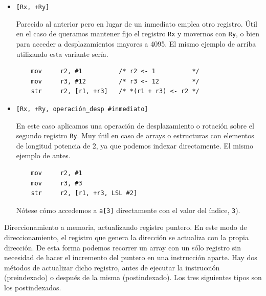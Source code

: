 \begin{descript}
\begin{itemize}
\begin{lstlisting}
    mov     r2, #1          /* r2 <- 1          */
    str     r2, [r1, #+12]  /* *(r1 + 12) <- r2 */
\end{lstlisting}

    Nótese que hemos multiplicado por 4 el desplazamiento porque cada
    elemento del array son 4 bytes. El desplazamiento no puede ser mayor
    de 12 bits, por lo que nuestro rango está límitado entre {\tt [Rx, \#-4095]}
    y {\tt [Rx, \#+4095]}.

  \item{\tt [Rx, +Ry] \newline
            [Rx, -Ry] \newline}

    Parecido al anterior pero en lugar de un inmediato emplea otro registro. Útil
    en el caso de queramos mantener fijo el registro {\tt Rx} y movernos con {\tt Ry},
    o bien para acceder a desplazamientos mayores a 4095. El mismo ejemplo de
    arriba utilizando esta variante sería.

\begin{lstlisting}
    mov     r2, #1          /* r2 <- 1          */
    mov     r3, #12         /* r3 <- 12         */
    str     r2, [r1, +r3]   /* *(r1 + r3) <- r2 */
\end{lstlisting}

  \item{\tt [Rx, +Ry, operación\_desp \#inmediato]  \newline}

    En este caso aplicamos una operación de desplazamiento
    o rotación sobre el segundo registro {\tt Ry}. Muy útil
    en caso de arrays o estructuras con elementos de longitud
    potencia de 2, ya que podemos indexar directamente. El
    mismo ejemplo de antes.
    
\begin{lstlisting}
    mov     r2, #1
    mov     r3, #3
    str     r2, [r1, +r3, LSL #2]
\end{lstlisting}

    Nótese cómo accedemos a {\tt a[3]}
    directamente con el valor del índice, {\tt 3}).
\end{itemize}


  \item[Direccionamiento a memoria, actualizando registro puntero.]
    En este modo de direccionamiento, el registro que genera la dirección
    se actualiza con la propia dirección. De esta forma podemos recorrer
    un array con un sólo registro sin necesidad de hacer el incremento del
    puntero en una instrucción aparte. Hay dos métodos de actualizar dicho
    registro, antes de ejecutar la instrucción (preindexado) o después
    de la misma (postindexado). Los tres siguientes tipos son los
    postindexados.


\end{descript}

